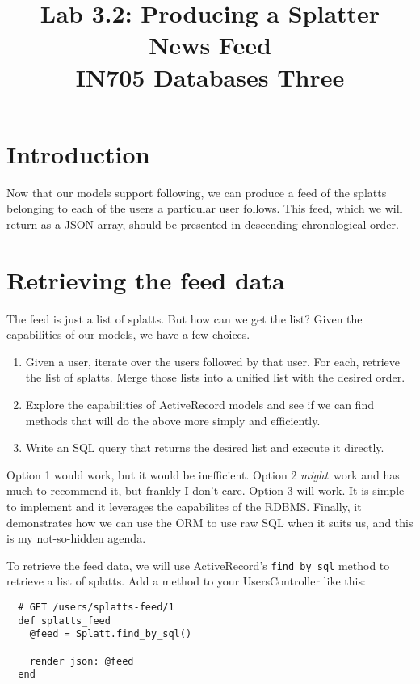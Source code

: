 \documentclass{article}
\begin{document}
\title{Lab 3.2: Producing a Splatter News Feed\\ IN705 Databases Three}
\date{}
\maketitle

\section*{Introduction}
Now that our models support following, we can produce a feed of the splatts belonging to each of the users a particular user follows.  This feed, which we will return as a JSON array, should be presented in descending chronological order.

\section{Retrieving the feed data}
The feed is just a list of splatts.  But how can we get the list?  Given the capabilities of our models, we have a few choices.

\begin{enumerate}
  \item Given a user, iterate over the users followed by that user.  For each, retrieve the list of splatts.  Merge those lists into a unified list with the desired order.

  \item Explore the capabilities of ActiveRecord models and see if we can find methods that will do the above more simply and efficiently.

  \item Write an SQL query that returns the desired list and execute it directly.
\end{enumerate}

Option 1 would work, but it would be inefficient.  Option 2 \emph{might} work and has much to recommend it, but frankly I don't care.  Option 3 will work.  It is simple to implement and it leverages the capabilites of the RDBMS.  Finally, it demonstrates how we can use the ORM to use raw SQL when it suits us, and this is my not-so-hidden agenda.

To retrieve the feed data, we will use ActiveRecord's \texttt{find\_by\_sql} method to retrieve a list of splatts.  Add a method to your UsersController like this:

\begin{verbatim}
  # GET /users/splatts-feed/1
  def splatts_feed
    @feed = Splatt.find_by_sql()

    render json: @feed
  end
\end{verbatim}
\end{document}

